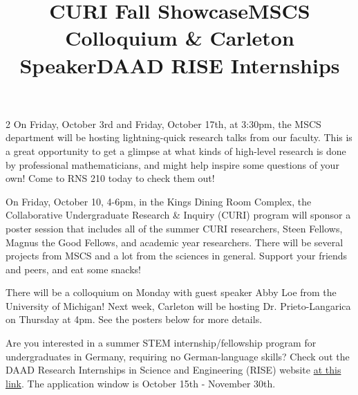 \documentclass[12pt]{article}
\newcommand{\bolder}{\textbf}
\begin{document}
\begin{multicols}{2}
On Friday, October 3rd and Friday, October 17th, at 3:30pm, the MSCS department will be hosting lightning-quick research talks from our faculty. This is a great opportunity to get a glimpse at what kinds of high-level research is done by professional mathematicians, and might help inspire some questions of your own! Come to RNS 210 today to check them out!


\begin{tcolorbox}[colback=white, colframe=black]
    \begin{center}
    \title{{\large \bolder{CURI Fall Showcase}}}
    \end{center}
\end{tcolorbox}

On Friday, October 10, 4-6pm, in the Kings Dining Room Complex, the Collaborative Undergraduate Research \& Inquiry (CURI) program will sponsor a poster session that includes all of the summer CURI researchers, Steen Fellows, Magnus the Good Fellows, and academic year researchers. There will be several projects from MSCS and a lot from the sciences in general. Support your friends and peers, and eat some snacks!

 \begin{tcolorbox}[colback=white, colframe=black]
    \begin{center}
    \title{{\large \bolder{MSCS Colloquium \& Carleton Speaker}}}
    \end{center}
\end{tcolorbox}

There will be a colloquium on Monday with guest speaker Abby Loe from the University of Michigan! Next week, Carleton will be hosting Dr. Prieto-Langarica on Thursday at 4pm. See the posters below for more details. 


 \begin{tcolorbox}[colback=white, colframe=black]
    \begin{center}
    \title{{\large \bolder{DAAD RISE Internships}}}
    \end{center}
\end{tcolorbox}

Are you interested in a summer STEM internship/fellowship program for undergraduates in Germany, requiring no German-language skills? Check out the DAAD Research Internships in Science and Engineering (RISE) website \href{https://www.daad.de/rise/en/}{at this link}. The application window is October 15th - November 30th.



\end{multicols}
\end{document}
